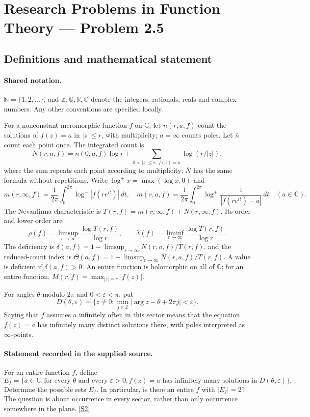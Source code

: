 \documentclass[11pt]{article}
\newcommand{\sref}[2]{\hyperlink{source:#1:#2}{[S#2]}}
\begin{document}
\section{Research Problems in Function Theory — Problem 2.5}\label{statement}

\subsection{Definitions and mathematical statement}

\paragraph{Shared notation.}$\mathbb N=\{1,2,\ldots\}$, and $\mathbb Z,\mathbb Q,\mathbb R,\mathbb C$ denote the integers, rationals, reals and complex numbers. Any other conventions are specified locally.


For a nonconstant meromorphic function $f$ on $\mathbb C$, let $n(r,a,f)$ count the solutions of $f(z)=a$ in $|z|\le r$, with multiplicity; $a=\infty$ counts poles. Let $\bar n$ count each point once. The integrated count is
\[
 N(r,a,f)=n(0,a,f)\log r+\sum_{0<|z|\le r,\ f(z)=a}\log(r/|z|),
\]
where the sum repeats each point according to multiplicity; $\bar N$ has the same formula without repetitions. Write $\log^+x=\max(\log x,0)$ and
\[
 m(r,\infty,f)=\frac1{2\pi}\int_0^{2\pi}\log^+|f(re^{it})|\,dt,\quad
 m(r,a,f)=\frac1{2\pi}\int_0^{2\pi}\log^+\frac1{|f(re^{it})-a|}\,dt\quad(a\in\mathbb C).
\]
The Nevanlinna characteristic is $T(r,f)=m(r,\infty,f)+N(r,\infty,f)$. Its order and lower order are
\[
 \rho(f)=\limsup_{r\to\infty}\frac{\log T(r,f)}{\log r},\qquad
 \lambda(f)=\liminf_{r\to\infty}\frac{\log T(r,f)}{\log r}.
\]
The deficiency is $\delta(a,f)=1-\limsup_{r\to\infty}N(r,a,f)/T(r,f)$, and the reduced-count index is $\Theta(a,f)=1-\limsup_{r\to\infty}\bar N(r,a,f)/T(r,f)$. A value is deficient if $\delta(a,f)>0$. An entire function is holomorphic on all of $\mathbb C$; for an entire function, $M(r,f)=\max_{|z|=r}|f(z)|$.

For angles $\theta$ modulo $2\pi$ and $0<\varepsilon<\pi$, put
\[
 D(\theta,\varepsilon)=\{z\ne0:\min_{j\in\mathbb Z}|\arg z-\theta+2\pi j|<\varepsilon\}.
\]
Saying that $f$ assumes $a$ infinitely often in this sector means that the equation $f(z)=a$ has infinitely many distinct solutions there, with poles interpreted as $\infty$-points.
\paragraph{Statement recorded in the supplied source.}
For an entire function $f$, define
\[
 E_f=\{a\in\mathbb C:\text{for every }\theta\text{ and every }\varepsilon>0,
             f(z)=a\text{ has infinitely many solutions in }D(\theta,\varepsilon)\}.
\]
Determine the possible sets $E_f$. In particular, is there an entire $f$ with $|E_f|=2$? The question is about occurrence in every sector, rather than only occurrence somewhere in the plane. \sref{statement}{2}
\end{document}
